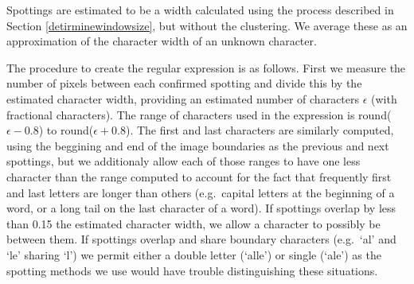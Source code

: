 \documentclass[ms,electronic,twosidetoc,letterpaper,chaptercenter,parttop,lol,lof,lot]{byumsphd}
\begin{document}
Spottings are estimated to be a width calculated using the process described in Section \ref{detirminewindowsize}, but without the clustering.
We average these as an approximation of the character width of an unknown character.

The procedure to create the regular expression is as follows. First we measure the number of pixels between each confirmed spotting and divide this by the estimated character width, providing an estimated number of characters $\epsilon$ (with fractional characters). The range of characters used in the expression is 
round($\epsilon-0.8$) to round($\epsilon+0.8$).
 The first and last characters are similarly computed, using the beggining and end of the image boundaries as the previous and next spottings, but we additionaly allow each of those ranges to have one less character than the range computed to account for the fact that frequently first and last letters are longer than others (e.g.~capital letters at the beginning of a word, or a long tail on the last character of a word). If spottings overlap by less than 0.15 the estimated character width, we allow a character to possibly be between them. If spottings overlap and share boundary characters (e.g.~`al' and `le' sharing `l') we permit either a double letter (`alle') or single (`ale') as the spotting methods we use would have trouble distinguishing these situations. 

% 
%  
\end{document}
